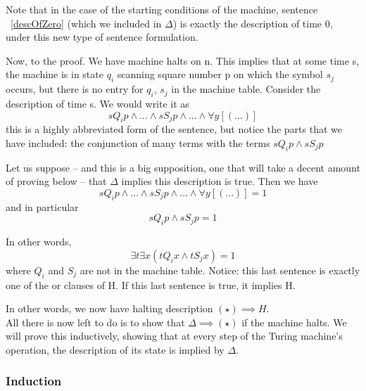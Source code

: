 Note that in the case of the starting conditions of the machine, sentence ~\ref{descOfZero} (which we included in $\Delta$) is exactly the description of time 0, under this new type of sentence formulation.




Now, to the proof.
We have machine halts on n.
This implies that at some time s, the machine is in state $q_i$ scanning square number p on which the symbol $s_j$ occurs, but there is no entry for $q_i$, $s_j$ in the machine table.
Consider the description of time s. We would write it as 
\[sQ_ip \land \dots \land sS_jp \land \dots \land \forall y [(\dots)]\]
this is a highly abbreviated form of the sentence, but notice the parts that we have included:
	the conjunction of many terms with the terms
	$sQ_ip \land sS_jp$

Let us suppose -- and this is a big supposition, one that will take a decent amount of proving below -- that $\Delta$ implies this description is true. Then we have 
\[sQ_ip \land \dots \land sS_jp \land \dots \land \forall y [(\dots)] = 1 \tag{$\star$}\]
and in particular
\[sQ_ip \land sS_jp = 1\]

In other words, 
\[\exists t \exists x (tQ_ix \land tS_jx) = 1\]
where $Q_i$ and $S_j$ are not in the machine table.
Notice: this last sentence is exactly one of the or clauses of H. If this last sentence is true, it implies H.

In other words, we now have 
halting description $(\star)\implies H$.\\
All there is now left to do is to show that $\Delta \implies (\star)$ if the machine halts.
We will prove this inductively, showing that at every step of the Turing machine's operation, the description of its state is implied by $\Delta$.


\subsubsection{Induction}
